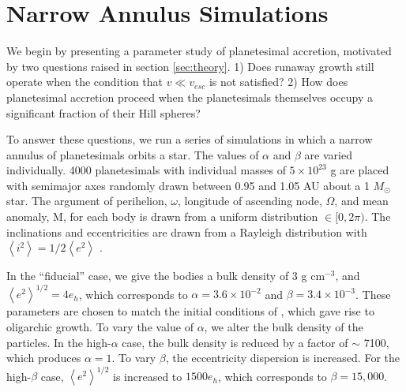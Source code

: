 \documentclass[twocolumn]{aastex63}
\begin{document}
\section{Narrow Annulus Simulations}\label{sec:narrow}

We begin by presenting a parameter study of planetesimal accretion,
motivated by two questions raised in section \ref{sec:theory}. 1) Does
runaway growth still operate when the condition that $v \ll v_{esc}$
is not satisfied? 2) How does planetesimal accretion proceed when the planetesimals themselves occupy a significant fraction of 
their Hill spheres?

To answer these questions, we run a series of simulations in which a
narrow annulus of planetesimals orbits a star. The values of $\alpha$
and $\beta$ are varied individually. 4000 planetesimals with
individual masses of $5 \times 10^{23}$ g are placed with semimajor
axes randomly drawn between 0.95 and 1.05 AU about a 1 $M_{\odot}$
star. The argument of perihelion, $\omega$, longitude of ascending node,
$\Omega$, and mean anomaly, M, for each body is drawn from a uniform
distribution $\in [0, 2 \pi)$. The inclinations and eccentricities are drawn
from a Rayleigh distribution with
$\left< i^{2} \right> = 1/2 \left< e^{2} \right>$ \citep{ida93a}.

In the ``fiducial'' case, we give the bodies a bulk density of 3 g
cm$^{-3}$, and $\left< e^{2} \right>^{1/2} = 4 e_{h}$, which corresponds to $\alpha = 3.6 \times 10^{-2}$ and $\beta = 3.4 \times 
10^{-3}$. These parameters are chosen to match the initial conditions of \citet{kokubo98}, which gave rise to oligarchic growth. 
To vary the value of $\alpha$, we alter the bulk density of the particles. In the high-$\alpha$ case, the bulk density is reduced by 
a factor of $\sim$ 7100, which produces $\alpha = 1$. To vary $\beta$, the eccentricity dispersion is increased. For the high-$
\beta$ case, $\left< e^{2} \right>^{1/2}$ is increased to $1500 e_{h}$, which corresponds to $\beta = 15,000$.
\end{document}

